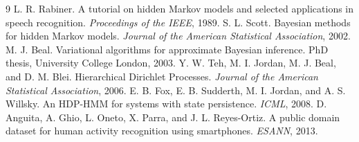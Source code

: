 \begin{thebibliography}{9}
 L. R. Rabiner. A tutorial on hidden Markov models and selected applications in speech recognition. \textit{Proceedings of the IEEE}, 1989.
 S. L. Scott. Bayesian methods for hidden Markov models. \textit{Journal of the American Statistical Association}, 2002.
 M. J. Beal. Variational algorithms for approximate Bayesian inference. PhD thesis, University College London, 2003.
 Y. W. Teh, M. I. Jordan, M. J. Beal, and D. M. Blei. Hierarchical Dirichlet Processes. \textit{Journal of the American Statistical Association}, 2006.
 E. B. Fox, E. B. Sudderth, M. I. Jordan, and A. S. Willsky. An HDP-HMM for systems with state persistence. \textit{ICML}, 2008.
 D. Anguita, A. Ghio, L. Oneto, X. Parra, and J. L. Reyes-Ortiz. A public domain dataset for human activity recognition using smartphones. \textit{ESANN}, 2013.
\end{thebibliography}
